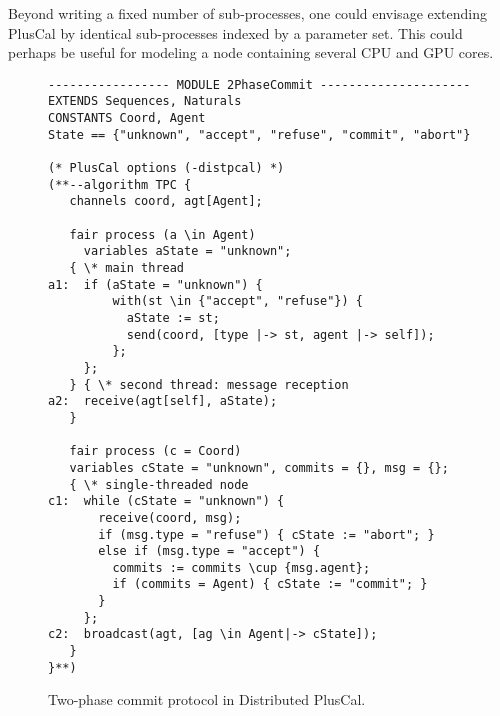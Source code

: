 \documentclass{article}
\begin{document}
Beyond writing a fixed number of sub-processes, one could envisage extending PlusCal by identical sub-processes indexed by a parameter set. This could perhaps be useful for modeling a node containing several CPU and GPU cores.




\begin{figure}
\begin{lstlisting}[language=pluscal,frame = tlrb, numbers=none]
----------------- MODULE 2PhaseCommit ---------------------
EXTENDS Sequences, Naturals
CONSTANTS Coord, Agent
State == {"unknown", "accept", "refuse", "commit", "abort"}

(* PlusCal options (-distpcal) *)
(**--algorithm TPC {
   channels coord, agt[Agent];
     
   fair process (a \in Agent)
     variables aState = "unknown"; 
   { \* main thread
a1:  if (aState = "unknown") {
         with(st \in {"accept", "refuse"}) {
           aState := st;
           send(coord, [type |-> st, agent |-> self]);
         };
     };
   } { \* second thread: message reception
a2:  receive(agt[self], aState); 
   }

   fair process (c = Coord) 
   variables cState = "unknown", commits = {}, msg = {};
   { \* single-threaded node
c1:  while (cState = "unknown") {
       receive(coord, msg);
       if (msg.type = "refuse") { cState := "abort"; }
       else if (msg.type = "accept") {
         commits := commits \cup {msg.agent};
         if (commits = Agent) { cState := "commit"; }
       }
     };
c2:  broadcast(agt, [ag \in Agent|-> cState]);
   }
}**)
\end{lstlisting}
  \caption{Two-phase commit protocol in Distributed PlusCal.}
  \label{fig:two-phase}
\end{figure}
\end{document}
